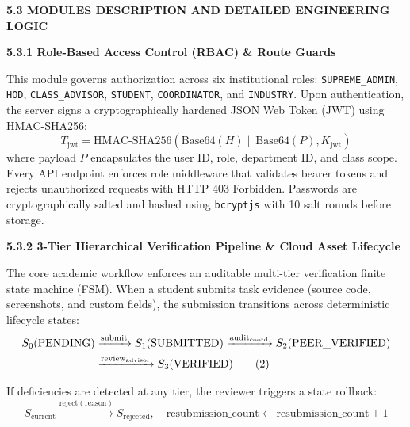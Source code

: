 \vspace{0.3cm}
{\fontsize{14pt}{18pt}\selectfont\bfseries 5.3 MODULES DESCRIPTION AND DETAILED ENGINEERING LOGIC\par}
\vspace{0.2cm}
{\fontsize{13pt}{17pt}\selectfont\bfseries 5.3.1 Role-Based Access Control (RBAC) \& Route Guards\par}
\vspace{0.2cm}

{\fontsize{12pt}{17.5pt}\selectfont
This module governs authorization across six institutional roles: \texttt{SUPREME\_ADMIN}, \texttt{HOD}, \texttt{CLASS\_ADVISOR}, \texttt{STUDENT}, \texttt{COORDINATOR}, and \texttt{INDUSTRY}. Upon authentication, the server signs a cryptographically hardened JSON Web Token (JWT) using HMAC-SHA256:
\begin{equation}
T_{\text{jwt}} = \text{HMAC-SHA256}(\text{Base64}(H) \parallel \text{Base64}(P), K_{\text{jwt}}) \tag{1}
\end{equation}
where payload $P$ encapsulates the user ID, role, department ID, and class scope. Every API endpoint enforces role middleware that validates bearer tokens and rejects unauthorized requests with HTTP 403 Forbidden. Passwords are cryptographically salted and hashed using \texttt{bcryptjs} with 10 salt rounds before storage.

\vspace{0.4cm}
{\fontsize{13pt}{17pt}\selectfont\bfseries 5.3.2 3-Tier Hierarchical Verification Pipeline \& Cloud Asset Lifecycle\par}
\vspace{0.2cm}

The core academic workflow enforces an auditable multi-tier verification finite state machine (FSM). When a student submits task evidence (source code, screenshots, and custom fields), the submission transitions across deterministic lifecycle states:
\begin{align}
S_0 (\text{PENDING}) &\xrightarrow{\text{submit}} S_1 (\text{SUBMITTED}) \xrightarrow{\text{audit}_{\text{coord}}} S_2 (\text{PEER\_VERIFIED}) \notag \\
&\xrightarrow{\text{review}_{\text{advisor}}} S_3 (\text{VERIFIED}) \tag{2}
\end{align}

If deficiencies are detected at any tier, the reviewer triggers a state rollback:
\begin{equation}
S_{\text{current}} \xrightarrow{\text{reject}(\text{reason})} S_{\text{rejected}}, \quad \text{resubmission\_count} \leftarrow \text{resubmission\_count} + 1 \tag{3}
\end{equation}

}
